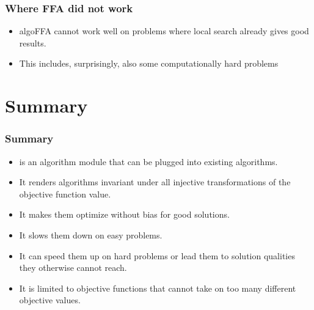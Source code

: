 \documentclass[aspectratio=169,mathserif,notheorems]{beamer}%
\begin{document}
%
\begin{frame}%
\frametitle{Where FFA did not work}%
\begin{itemize}%
\item \Gls{algoFFA} cannot work well on problems where local search already gives good results.%
\item<2-> This includes, surprisingly, also some computationally hard problems%
\end{itemize}%
\end{frame}%
%
\section{Summary}%
%
\begin{frame}%
\frametitle{Summary}%
\begin{itemize}%
\item {} is an algorithm module that can be plugged into existing algorithms.%
\item<2-> It renders algorithms invariant under all injective transformations of the objective function value.%
\item<3-> It makes them optimize without bias for good solutions.%
\item<4-> It slows them down on easy problems.%
\item<5-> It can speed them up on hard problems or lead them to solution qualities they otherwise cannot reach.%
\item<6-> It is limited to objective functions that cannot take on too many different objective values.%
\end{itemize}%
\end{frame}%
%
%
%
\endPresentation%
\end{document}
